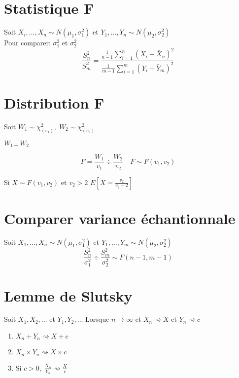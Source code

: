 \section{Statistique F}\label{stats:stats:f}

Soit \(X_i,\dots,X_n\sim N(\mu_1,\sigma^2_1)\) et
\(Y_1,\dots,Y_n \sim N(\mu_2,\sigma_2^2)\)\\
Pour comparer: \(\sigma_1^2\) et \(\sigma^2_2\) \[
\frac{S_n^2}{S_m^2}=\frac{\frac{1}{n-1}\sum_{i=1}^n(X_i-\bar{X}_n)^2}{\frac{1}{m-1}\sum_{i=1}^m(Y_i-\bar{Y}_m)^2}
\]

\section{Distribution F}\label{stats:dist:f}

Soit \(W_1\sim\chi^2_{(v_1)},\;W_2\sim\chi^2_{(v_2)}\)

\(W_1 \bot\, W_2\)

\[
F=\dfrac{W_1}{v_1}\div\dfrac{W_2}{v_2}\quad
F\sim F(v_1,v_2)
\]

Si \(X \sim F(v_1,v_2)\) et \(v_2>2\)
\(E\left[X =\frac{v_2}{v_2-2}\right]\)

\section{Comparer variance échantionnale}\label{stats:stats:f:varuxe9chan}

Soit \(X_1,\dots,X_n\sim N(\mu_1,\sigma^2_1)\) et
\(Y_1,\dots,Y_m\sim N(\mu_2,\sigma^2_2)\) \[
\dfrac{S^2_n}{\sigma^2_1}\div\dfrac{S_m^2}{\sigma^2_2}\sim F(n-1,m-1)
\]

\section{Lemme de Slutsky}\label{lemme-de-slutsky}

Soit \(X_1,X_2,\dots\) et \(Y_1,Y_2,\dots\) Lorsque
\(n \rightarrow \infty\) et \(X_n \rightsquigarrow X\) et
\(Y_n \rightsquigarrow c\)

\begin{enumerate}
\def\labelenumi{\arabic{enumi}.}
\item
  \(X_n+Y_n \rightsquigarrow X+c\)
\item
  \(X_n\times Y_n \rightsquigarrow X\times c\)
\item
  Si \(c>0,\; \frac{X_n}{Y_n} \rightsquigarrow \frac{X}{c}\)
\end{enumerate}

